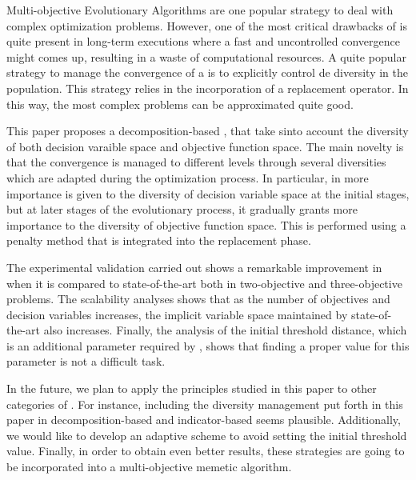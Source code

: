Multi-objective Evolutionary Algorithms are one popular strategy to deal with complex optimization problems.
%
However, one of the most critical drawbacks of \EAS{} is quite present in long-term executions where a fast and uncontrolled convergence might comes up, resulting in a waste of computational resources.
%
A quite popular strategy to manage the convergence of a \EA{} is to explicitly control de diversity in the population.
%
This strategy relies in the incorporation of a replacement operator.
%
In this way, the most complex problems can be approximated quite good.
%

This paper proposes a decomposition-based \MOEA{}, that take sinto account the diversity of both decision varaible space and objective function space.
%
The main novelty is that the convergence is managed to different levels through several diversities which are adapted during the optimization process.
%
In particular, in \VSDMOEA{} more importance is given to the diversity of decision variable space at the initial stages, but at later stages of the evolutionary process, it gradually grants more importance to the diversity of  objective function space.
%
This is performed using a penalty method that is integrated into the replacement phase.
%

The experimental validation carried out shows a remarkable improvement in \VSDMOEA{} when it is compared to state-of-the-art \MOEAS{} both in two-objective and three-objective problems.
%
The scalability analyses shows that as the number of objectives and decision variables increases, the implicit variable space maintained by state-of-the-art \MOEAS{} also increases.
%
Finally, the analysis of the initial threshold distance, which is an additional parameter required by \VSDMOEA{}, shows that finding a proper value for this parameter is not a difficult task.
%

In the future, we plan to apply the principles studied in this paper to other categories of \MOEAS{}.
%
For instance, including the diversity management put forth in this paper in decomposition-based and indicator-based \MOEAS{} seems plausible.
%
Additionally, we would like to develop an adaptive scheme to avoid setting the initial threshold value.
%
Finally, in order to obtain even better results, these strategies are going to be incorporated into a multi-objective memetic algorithm.
%
